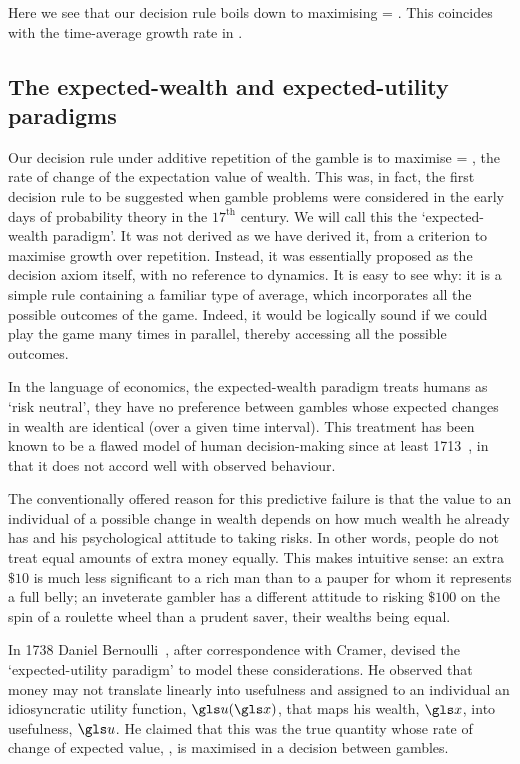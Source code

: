 Here we see that our decision rule boils down to maximising
\be
\ave{\frac{\ln \gr}{\dt}} = \ave{\frac{\ln(\x(\tn)+\gD)-\ln \x(\tn)}{\dt}}.
\ee
This coincides with the time-average growth rate in .

\subsection{The expected-wealth and expected-utility paradigms}
Our decision rule under additive repetition of the gamble is to maximise
\be
\ave{\frac{\d\x}{\dt}} = \ave{\frac{\gD}{\dt}},
\ee
\ie the rate of change of the expectation value of wealth. This was, in fact, the first 
decision rule to be suggested when gamble problems were considered in the early 
days of probability theory in the $17^\text{th}$ century. We will call this the 
`expected-wealth paradigm'. It was not derived as we have derived it, from a 
criterion to maximise growth over repetition. Instead, it was essentially proposed 
as the decision axiom itself, with no reference to dynamics. It is easy to see why: 
it is a simple rule containing a familiar type of average, which incorporates all the 
possible outcomes of the game. Indeed, it would be logically sound if we could play 
the game many times in parallel, thereby accessing all the possible outcomes.

In the language of economics, the expected-wealth paradigm treats humans as 
`risk neutral', \ie they have no preference between gambles whose expected 
changes in wealth are identical (over a given time interval). This treatment has 
been known to be a flawed model of human decision-making since at least 
1713~\cite[p.~402]{Montmort1713}, in that it does not accord well with observed behaviour.

The conventionally offered reason for this predictive failure is that the value to an 
individual of a possible change in wealth depends on how much wealth he already 
has and his psychological attitude to taking risks. In other words, people do not 
treat equal amounts of extra money equally. This makes intuitive sense: an extra 
$\$10$ is much less significant to a rich man than to a pauper for whom it 
represents a full belly; an inveterate gambler has a different attitude to risking 
$\$100$ on the spin of a roulette wheel than a prudent saver, their wealths 
being equal.

In 1738 Daniel Bernoulli~\cite{Bernoulli1738}, after correspondence with Cramer, devised the `expected-utility paradigm' to model these considerations. He observed that money may not translate linearly into usefulness and assigned to an individual an idiosyncratic utility function, $\gu(\x)$, that maps his wealth, $\x$, 
into usefulness, $\gu$. He claimed that this was the true quantity whose rate of change of expected value,
\be
\ave{\gr_\gu} \equiv \ave{\frac{\d\gu(\x)}{\dt}},
\ee
is maximised in a decision between gambles.

